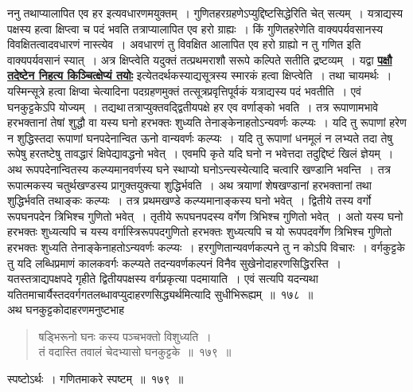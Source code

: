\documentclass[11pt, openany]{book}
\begin{document}
\vspace{-4mm}
 ननु तथाप्यालापित एव हर इत्यवधारणमयुक्तम्~।
गुणितहरग्रहणेऽप्युद्दिष्टसिद्धेरिति चेत् सत्यम्~। यत्राद्यस्य पक्षस्य हत्वा क्षिप्त्वा च पदं भवति तत्राप्यालापित
एव हरो ग्राह्यः~। किं गुणितहरेणेति वाक्यपर्यवसानस्य विवक्षितत्वादवधारणं
नास्त्येव~। अवधारणं  तु विवक्षित आलापित एव हरो ग्राह्यो न तु गणित इति वाक्यपर्यवसानं स्यात्~। अत्र क्षिप्त्वेति यदुक्तं तत्प्रथमराशौ सरूपे कल्पिते सतीति
द्रष्टव्यम्~।
यद्वा \hyperref[115]{\textbf{पक्षौ तदेष्टेन निहत्य किञ्चित्क्षेप्यं तयोः}}
इत्येतदर्थकस्याद्यसूत्रस्य स्मारकं हत्वा क्षिप्त्वेति~। तथा चायमर्थः~। यस्मिन्सूत्रे हत्वा क्षिप्वा चेत्यादिना पदग्रहणमुक्तं
तत्सूत्रप्रवृत्तिपूर्वकं यत्राद्यस्य पदं भवतीति~। एवं घनकुट्टकेऽपि
योज्यम्~। तद्यथा\textendash \,तत्राप्युक्तवद्द्वितीयपक्षे हर एव वर्णाङ्को भवति~। तत्र रूपाणामभावे
हरभक्तानां तेषां
शुद्धौ वा यस्य घनो हरभक्तः शुध्यति तेनाङ्केनाहतोऽन्यवर्णः कल्प्यः~।
यदि तु रूपाणां हरेण न शुद्धिस्तदा रूपाणां घनपदेनान्वित ऊनो वान्यवर्णः
कल्प्यः~। यदि
तु रूपाणां धनमूलं न लभ्यते तदा तेषु रूपेषु हरतष्टेषु तावद्धारं
क्षिपेद्यावद्धनो भवेत्~।
एवमपि कृते यदि घनो न भवेत्तदा तदुद्दिष्टं खिलं ज्ञेयम्~।
\newpage
अथ रूपपदेनान्वितस्य कल्प्यमानवर्णस्य घने स्थाप्यो घनोऽन्त्यस्येत्यादि
चत्वारि
 खण्डानि भवन्ति~। तत्र रूपात्मकस्य चतुर्थखण्डस्य प्रागुक्तयुक्त्या
शुद्धिर्भवति~। अथ
त्रयाणां शेषखण्डानां हरभक्तानां तथा शुद्धिर्भवति तथाङ्कः कल्प्यः~।
तत्र प्रथमखण्डे कल्प्यमानाङ्कस्य घनो भवेत्~। द्वितीये तस्य वर्गो रूपघनपदेन
त्रिभिश्च गुणितो
 भवेत्~। तृतीये रूपघनपदस्य वर्गेण त्रिभिश्च गुणितो भवेत्~। अतो यस्य घनो
हरभक्तः
 शुध्यत्यपि च यस्य वर्गास्त्रिरूपपदगुणितो हरभक्तः शुध्यत्यपि च यो
रूपपदवर्गेण
 त्रिभिश्च गुणितो हरभक्तः शुध्यति तेनाङ्केनाहतोऽन्यवर्णः कल्प्यः~।
हरगुणितान्यवर्णकल्पने तु न कोऽपि विचारः~। वर्गकुट्टके तु यदि लब्धिप्रमाणं कालकवर्गः कल्प्यते तदन्यवर्णकल्पनं विनैव सुखेनोदाहरणसिद्धिरस्ति~। यतस्तत्राद्यपक्षपदे
गृहीते द्वितीयपक्षस्य वर्गप्रकृत्या पदमायाति~। एवं सत्यपि यदन्यथा
यतितमाचार्यैस्तदवर्गगतलब्धावप्युदाहरणसिद्ध्यर्थमित्यादि सुधीभिरूह्यम्~॥~१७८~॥~\\

\vspace{-2mm}
 अथ घनकुट्टकोदाहरणमनुष्टभाह\textendash
\begin{quote}
    \eg 
      षड्भिरूनो घनः कस्य पञ्चभक्तो विशुध्यति~। \\
 तं वदास्ति तवालं चेदभ्यासो घनकुट्टके~॥~१७९~॥~
\end{quote}

 स्पष्टोऽर्थः~। गणितमाकरे स्पष्टम्~॥~१७९~॥~\\
\end{document}
